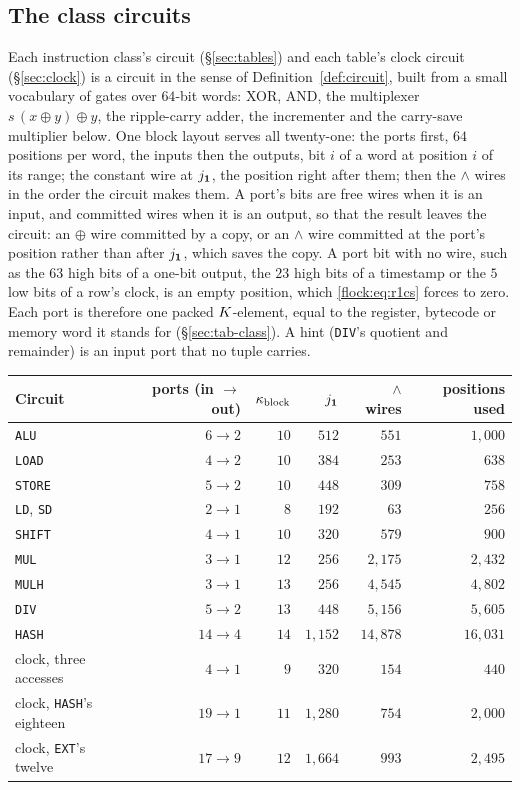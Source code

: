 \subsection{The class circuits}\label{flock:classes}

Each instruction class's circuit (\S\ref{sec:tables}) and each table's clock circuit (\S\ref{sec:clock}) is a circuit in the sense of Definition~\ref{def:circuit}, built from a small vocabulary of gates over $64$-bit words: XOR, AND, the multiplexer $s\,(x\oplus y)\oplus y$, the ripple-carry adder, the incrementer and the carry-save multiplier below. One block layout serves all twenty-one: the ports first, $64$ positions per word, the inputs then the outputs, bit $i$ of a word at position $i$ of its range; the constant wire at $j_{\mathbf{1}}$, the position right after them; then the $\wedge$ wires in the order the circuit makes them. A port's bits are free wires when it is an input, and committed wires when it is an output, so that the result leaves the circuit: an $\oplus$ wire committed by a copy, or an $\wedge$ wire committed at the port's position rather than after $j_{\mathbf{1}}$, which saves the copy. A port bit with no wire, such as the $63$ high bits of a one-bit output, the $23$ high bits of a timestamp or the $5$ low bits of a row's clock, is an empty position, which \eqref{flock:eq:r1cs} forces to zero. Each port is therefore one packed $K$-element, equal to the register, bytecode or memory word it stands for (\S\ref{sec:tab-class}). A hint (\texttt{DIV}'s quotient and remainder) is an input port that no tuple carries.
\begin{center}
\begin{tabular}{lrrrrr}
\hline
Circuit & ports (in $\to$ out) & $\kappa_{\mathrm{block}}$ & $j_{\mathbf{1}}$ & $\wedge$ wires & positions used\\
\hline
\texttt{ALU}   & $6\to2$  & $10$ & $512$   & $551$      & $1{,}000$\\
\texttt{LOAD}  & $4\to2$  & $10$ & $384$   & $253$      & $638$\\
\texttt{STORE} & $5\to2$  & $10$ & $448$   & $309$      & $758$\\
\texttt{LD}, \texttt{SD} & $2\to1$ & $8$ & $192$ & $63$ & $256$\\
\texttt{SHIFT} & $4\to1$  & $10$ & $320$   & $579$      & $900$\\
\texttt{MUL}   & $3\to1$  & $12$ & $256$   & $2{,}175$  & $2{,}432$\\
\texttt{MULH}  & $3\to1$  & $13$ & $256$   & $4{,}545$  & $4{,}802$\\
\texttt{DIV}   & $5\to2$  & $13$ & $448$   & $5{,}156$  & $5{,}605$\\
\texttt{HASH}  & $14\to4$ & $14$ & $1{,}152$ & $14{,}878$ & $16{,}031$\\
\hline
clock, three accesses & $4\to1$ & $9$ & $320$ & $154$ & $440$\\
clock, \texttt{HASH}'s eighteen & $19\to1$ & $11$ & $1{,}280$ & $754$ & $2{,}000$\\
clock, \texttt{EXT}'s twelve & $17\to9$ & $12$ & $1{,}664$ & $993$ & $2{,}495$\\
\hline
\end{tabular}
\end{center}
